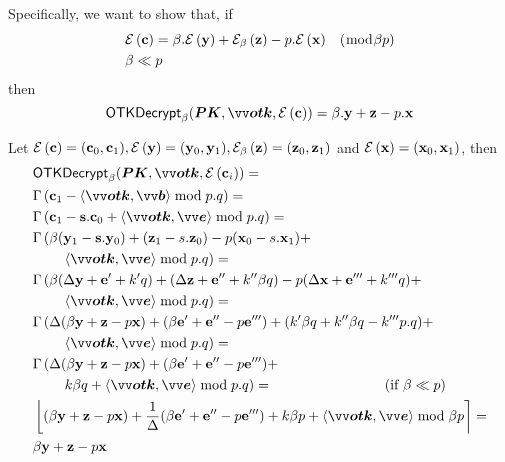 Specifically, we want to show that, if 
\begin{align*}
&\mathcal{E}\left({\mathbf{c}}\right)=\beta.\mathcal{E}\left({\mathbf{y}}\right)+\mathcal{E}_{\beta}\left({\mathbf{z}}\right)-p.\mathcal{E}\left({\mathbf{x}}\right) \;\;\;(\bmod \beta p)\\
&\beta\ll p
\end{align*}
then
\begin{equation*}
   \textsf{OTKDecrypt}_{\beta}(\p{PK},\pv{otk},\enc{\pc}) = \beta.\py+\pz-p.\px
\end{equation*}

Let $\mathcal{E}\left({\mathbf{c}}\right)=(\mathbf{c}_0,\mathbf{c}_1), \mathcal{E}\left({\mathbf{y}}\right)=(\mathbf{y}_0,\mathbf{y}_1), \mathcal{E}_{\beta}\left({\mathbf{z}}\right)=(\mathbf{z}_0,\mathbf{z}_1)$ and $\mathcal{E}\left({\mathbf{x}}\right)=(\mathbf{x}_0,\mathbf{x}_1)$, then
\begin{align*}
&\textsf{OTKDecrypt}_{\beta}(\p{PK},\pv{otk},\enc{\pc_i}) =\\
&\Gamma\left(\pc_1 - \inprod{\pv{otk}}{\pv{b}} \bmod p.q\right)=\\
&\Gamma\left(\pc_1 - \ps.\pc_0+\inprod{\pv{otk}}{\pv{e}} \bmod p.q\right)=\\
&\Gamma\left(\beta(\py_1 - \ps.\py_0)+(\pz_1-s.\pz_0)-p(\px_0-s.\px_1)+\right.\\
&\quad\quad\left.\inprod{\pv{otk}}{\pv{e}} \bmod p.q\right)=\\
&\Gamma\left(\beta(\Delta\py +\pe'+k'q) +(\Delta\pz+\pe''+k''\beta q)-p(\Delta\px+\pe'''+k'''q)+\right.\\
&\quad\quad\left.\inprod{\pv{otk}}{\pv{e}} \bmod p.q\right)=\\
&\Gamma\left(\Delta(\beta\py+\pz-p\px)+(\beta\pe'+\pe''-p\pe''')+(k'\beta q+ k''\beta q-k'''p.q)+\right.\\
&\quad\quad\left.\inprod{\pv{otk}}{\pv{e}} \bmod p.q\right)=\\
&\Gamma\left(\Delta(\beta\py+\pz-p\px)+(\beta\pe'+\pe''-p\pe''')+\right.\\
&\quad\quad\left.k\beta q +\inprod{\pv{otk}}{\pv{e}} \bmod p.q\right)=\hspace{8em}(\textrm{if } \beta\ll p)\\
&\round{(\beta\py+\pz-p\px)+\frac{1}{\Delta}(\beta\pe'+\pe''-p\pe''')+k\beta p +\inprod{\pv{otk}}{\pv{e}} \bmod \beta p} =\\
&\beta\py+\pz-p\px
\end{align*}



